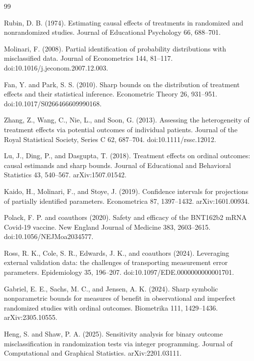 \documentclass{article}
\begin{document}
\begin{thebibliography}{99}

   Rubin, D. B. (1974). Estimating causal effects of treatments in randomized and nonrandomized studies. Journal of Educational Psychology 66, 688--701.

   Molinari, F. (2008). Partial identification of probability distributions with misclassified data. Journal of Econometrics 144, 81--117. doi:10.1016/j.jeconom.2007.12.003.

   Fan, Y. and Park, S. S. (2010). Sharp bounds on the distribution of treatment effects and their statistical inference. Econometric Theory 26, 931--951. doi:10.1017/S0266466609990168.

   Zhang, Z., Wang, C., Nie, L., and Soon, G. (2013). Assessing the heterogeneity of treatment effects via potential outcomes of individual patients. Journal of the Royal Statistical Society, Series C 62, 687--704. doi:10.1111/rssc.12012.

   Lu, J., Ding, P., and Dasgupta, T. (2018). Treatment effects on ordinal outcomes: causal estimands and sharp bounds. Journal of Educational and Behavioral Statistics 43, 540--567. arXiv:1507.01542.

   Kaido, H., Molinari, F., and Stoye, J. (2019). Confidence intervals for projections of partially identified parameters. Econometrica 87, 1397--1432. arXiv:1601.00934.

   Polack, F. P. and coauthors (2020). Safety and efficacy of the BNT162b2 mRNA Covid-19 vaccine. New England Journal of Medicine 383, 2603--2615. doi:10.1056/NEJMoa2034577.

   Ross, R. K., Cole, S. R., Edwards, J. K., and coauthors (2024). Leveraging external validation data: the challenges of transporting measurement error parameters. Epidemiology 35, 196--207. doi:10.1097/EDE.0000000000001701.

   Gabriel, E. E., Sachs, M. C., and Jensen, A. K. (2024). Sharp symbolic nonparametric bounds for measures of benefit in observational and imperfect randomized studies with ordinal outcomes. Biometrika 111, 1429--1436. arXiv:2305.10555.

   Heng, S. and Shaw, P. A. (2025). Sensitivity analysis for binary outcome misclassification in randomization tests via integer programming. Journal of Computational and Graphical Statistics. arXiv:2201.03111.


\end{thebibliography}
\end{document}
